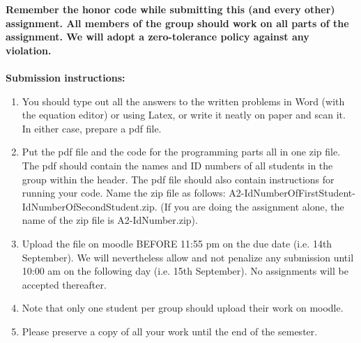 \documentclass[11pt]{article}
\begin{document}
\maketitle

\textbf{Remember the honor code while submitting this (and every other) assignment. All members of the group should work on all parts of the assignment. We will adopt a \textbf{zero-tolerance policy} against any violation.}
\\
\\
\textbf{Submission instructions:} 
\begin{enumerate}
\item You should type out all the answers to the written problems in Word (with the equation editor) or using Latex, or write it neatly on paper and scan it. In either case, prepare a pdf file. 
\item Put the pdf file and the code for the programming parts all in one zip file. The pdf should contain the names and ID numbers of all students in the group within the header. The pdf file should also contain instructions for running your code. Name the zip file as follows: A2-IdNumberOfFirstStudent-IdNumberOfSecondStudent.zip. (If you are doing the assignment alone, the name of the zip file is A2-IdNumber.zip). 
\item Upload the file on moodle BEFORE 11:55 pm on the due date (i.e. 14th September). We will nevertheless allow and not penalize any submission until 10:00 am on the following day (i.e. 15th September). No assignments will be accepted thereafter. 
\item Note that only one student per group should upload their work on moodle. 
\item Please preserve a copy of all your work until the end of the semester. 
\end{enumerate}
\end{document}
